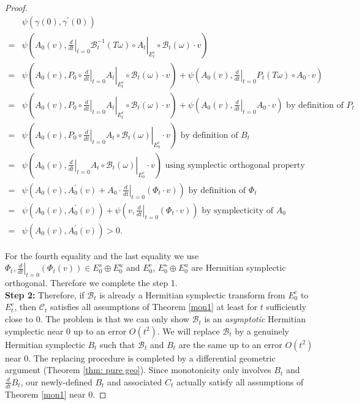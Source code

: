 \documentclass[11pt]{amsart}
\theoremstyle{remark}
\theoremstyle{definition}
\newcommand{\B}{{\mathbf B}}
\def \cC{{\mathcal{C}}}
\def \B{\mathcal{B}}
\begin{document}
\begin{proof}
		$$
		\begin{aligned}
			& \psi\left(\gamma(0), \gamma^{\prime}(0)\right) \\
			= & \psi\left(A_0(v),\left.\left.\frac{d}{d t}\right|_{t=0} \B_t^{-1}(T\omega) \circ A_t\right|_{E_t^c} \circ \B_t(\omega) \cdot v\right) \\
			= & \psi\left(A_0(v),\left.\left.P_0 \circ \frac{d}{d t}\right|_{t=0} A_t\right|_{E_t^c} \circ \B_t(\omega) \cdot v\right)+  \psi\left(A_0(v),\left.  \frac{d}{d t}\right|_{t=0}P_t(T\omega)\circ A_0 \cdot v\right) \\
				= & \psi\left(A_0(v),\left.\left.P_0 \circ \frac{d}{d t}\right|_{t=0} A_t\right|_{E_t^c} \circ \B_t(\omega) \cdot v\right)+  \psi\left(A_0(v),\left.  \frac{d}{d t}\right|_{t=0}A_0 \cdot v\right) \text { by definition of } P_t  \\
			= & \psi\left(A_0(v),\left.\left.P_0 \circ \frac{d}{d t}\right|_{t=0} A_t \circ \B_t(\omega)\right|_{E_0^c} \cdot v\right) \text { by definition of } B_t \\
			= & \psi\left(A_0(v),\left.\left.\frac{d}{d t}\right|_{t=0} A_t \circ \B_t(\omega)\right|_{E_0^c} \cdot v\right) \text { using symplectic orthogonal property } \\
			= & \psi\left(A_0(v), A_0^{\prime}(v)+\left.A_0 \cdot \frac{d}{d t}\right|_{t=0}\left(\Phi_t \cdot v\right)\right) \text { by definition of } \Phi_t \\
			= & \psi\left(A_0(v), A_0^{\prime}(v)\right)+\psi\left(v,\left.\frac{d}{d t}\right|_{t=0}\left(\Phi_t \cdot v\right)\right) \text { by symplecticity of } A_0\\
			=& \psi\left(A_0(v), A_0^{\prime}(v)\right)>0.
		\end{aligned}
		$$
		
		For the fourth equality and the last equality we use $\Phi_t,\left.\frac{d}{d t}\right|_{t=0}\left(\Phi_t(v)\right) \in E_0^s \oplus E_0^u$ and $E_0^c$,  $E_0^s \oplus E_0^u$ are Hermitian symplectic orthogonal. Therefore we complete the step 1.\\

\textbf{Step 2:} Therefore, if \( \B_t \) is already a Hermitian symplectic transform from \( E^c_0 \) to \( E^c_t \), then \( \cC_t \) satisfies all assumptions of Theorem \ref{mon1} at least for \( t \) sufficiently close to \( 0 \). The problem is that we can only show \( \B_t \) is an \textit{asymptotic} Hermitian symplectic near \( 0 \) up to an error \( O(t^2) \). We will replace \( \B_t \) by a genuinely Hermitian symplectic \( B_t \) such that \( \B_t \) and \( B_t \) are the same up to an error \( O(t^2) \) near \( 0 \). The replacing procedure is completed by a differential geometric argument (Theorem \ref{thm: pure geo}).  
Since monotonicity only involves \( B_t \) and \( \frac{d}{dt} B_t \), our newly-defined \( B_t \) and associated \( C_t \) actually satisfy all assumptions of Theorem \ref{mon1} near \( 0 \).



\end{proof}
\end{document}
